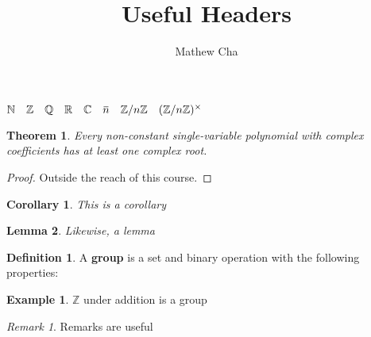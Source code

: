\documentclass{article}
\title{Useful Headers}
\author{Mathew Cha}
\newtheorem{theorem}{Theorem}[section]
\newtheorem{corollary}{Corollary}[theorem]
\newtheorem{lemma}[theorem]{Lemma}
\theoremstyle{definition}
\newtheorem{example}{Example}[section]
\newtheorem{definition}{Definition}[section]
\theoremstyle{remark}
\newtheorem*{remark}{Remark}
\newcommand{\N}{\mathbb{N}}
\newcommand{\Z}{\mathbb{Z}}
\newcommand{\Q}{\mathbb{Q}}
\newcommand{\R}{\mathbb{R}}
\newcommand{\C}{\mathbb{C}}
\newcommand{\overbar}[1]{\mkern 1.5mu\overline{\mkern-1.5mu#1\mkern-1.5mu}\mkern 1.5mu}
\newcommand{\modclass}[1]{\mathbb{Z}/#1\mathbb{Z}}
\newcommand{\modunits}[1]{(\mathbb{Z}/#1\mathbb{Z})^{\times}}
\begin{document}
\maketitle

$\N \quad \Z \quad \Q \quad \R \quad \C \quad \overbar{n} \quad \modclass{n} \quad \modunits{n}$\\
\begin{theorem}
Every non-constant single-variable polynomial with complex coefficients has at least one complex root. 
\end{theorem}

\begin{proof}
Outside the reach of this course.
\end{proof}

\begin{corollary}
This is a corollary
\end{corollary}

\begin{lemma}
Likewise, a lemma
\end{lemma}

\begin{definition}
A \textbf{group} is a set and binary operation with the following properties:
\end{definition}

\begin{example}
$\Z$ under addition is a group
\end{example}

\begin{remark}
Remarks are useful
\end{remark}
\end{document}
